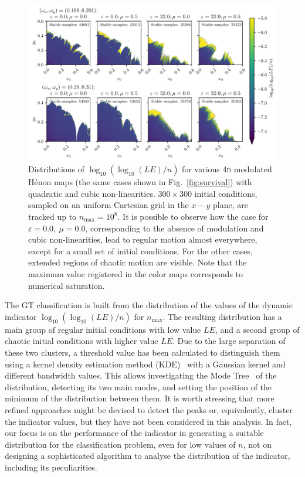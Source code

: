 \begin{figure}[th]
    \centering
    \includegraphics[width=\textwidth]{6_dynamic_indicators/fig/gt_example_colormap.pdf}
    \caption{Distributions of $\log_{10}(\log_{10}(LE)/n)$ for various 4\textsc{d} modulated Hénon maps (the same cases shown in Fig.~\ref{fig:survival}) with quadratic and cubic non-linearities. $300\times300$ initial conditions, sampled on an uniform Cartesian grid in the $x-y$ plane, are tracked up to $n_\text{max}=10^8$. It is possible to observe how the case for $\varepsilon=0.0,\ \mu=0.0$, corresponding to the absence of modulation and cubic non-linearities, lead to regular motion almost everywhere, except for a small set of initial conditions. For the other cases, extended regions of chaotic motion are visible. Note that the maximum value registered in the color maps corresponds to numerical saturation.}
    \label{fig:ground_truth_bis}
\end{figure}

The GT classification is built from the distribution of the values of the dynamic indicator $\log_{10}(\log_{10}(LE)/n)$ for $n_\text{max}$. The resulting distribution has a main group of regular initial conditions with low value $LE$, and a second group of chaotic initial conditions with higher value $LE$. Due to the large separation of these two clusters, a threshold value has been calculated to distinguish them using a kernel density estimation method (KDE)~\cite{doi:10.1080/24709360.2017.1396742, refId0} with a Gaussian kernel and different bandwidth values. This allows investigating the Mode Tree~\cite{10.2307/1390955} of the distribution, detecting its two main modes, and setting the position of the minimum of the distribution between them. It is worth stressing that more refined approaches might be devised to detect the peaks or, equivalently, cluster the indicator values, but they have not been considered in this analysis. In fact, our focus is on the performance of the indicator in generating a suitable distribution for the classification problem, even for low values of $n$, not on designing a sophisticated algorithm to analyse the distribution of the indicator, including its peculiarities.

